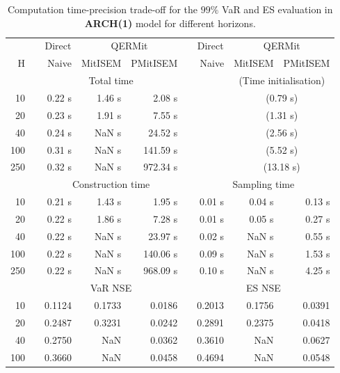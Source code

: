 \footnotesize{  
{ \renewcommand{\arraystretch}{1.3} 
\begin{longtable}{rr rrr r rrr}  
\caption{Computation time-precision trade-off for the  $99\%$ VaR and ES evaluation in \textbf{ARCH(1)} model for different horizons.} 
\label{tab:time_precision_arch_ML} \\ 
 & & \multicolumn{1}{c}{Direct} & \multicolumn{2}{c}{QERMit}&  & \multicolumn{1}{c}{Direct} & \multicolumn{2}{c}{QERMit} \\ \cline{3-5} \cline{7-9} 
 H & & Naive & MitISEM & PMitISEM & & Naive & MitISEM & PMitISEM \\ \hline 
 & & \multicolumn{3}{c}{Total time} & & & \multicolumn{2}{c}{(Time initialisation)}  \\ \cline{3-5} \cline{8-9}
10 & & 0.22 s & 1.46 s & 2.08 s &&& \multicolumn{2}{c}{(0.79 s)} \\ 
20 & & 0.23 s & 1.91 s & 7.55 s &&& \multicolumn{2}{c}{(1.31 s)} \\ 
40 & & 0.24 s &  NaN s & 24.52 s &&& \multicolumn{2}{c}{(2.56 s)} \\ 
100 & & 0.31 s &  NaN s & 141.59 s &&& \multicolumn{2}{c}{(5.52 s)} \\ 
250 & & 0.32 s &  NaN s & 972.34 s &&& \multicolumn{2}{c}{(13.18 s)} \\ 
\hline 
 & & \multicolumn{3}{c}{Construction time} & & \multicolumn{3}{c}{ Sampling time} \\ \cline{3-5}  \cline{7-9}
10 & & 0.21 s & 1.43 s & 1.95 s &&  0.01 s & 0.04 s & 0.13 s \\ 
20 & & 0.22 s & 1.86 s & 7.28 s &&  0.01 s & 0.05 s & 0.27 s \\ 
40 & & 0.22 s &  NaN s & 23.97 s &&  0.02 s &  NaN s & 0.55 s \\ 
100 & & 0.22 s &  NaN s & 140.06 s &&  0.09 s &  NaN s & 1.53 s \\ 
250 & & 0.22 s &  NaN s & 968.09 s &&  0.10 s &  NaN s & 4.25 s \\ 
\hline 
 & & \multicolumn{3}{c}{VaR NSE} &&  \multicolumn{3}{c}{ES NSE} \\ \cline{3-5}  \cline{7-9}
10 && 0.1124  & 0.1733  & 0.0186 && 0.2013  & 0.1756  & 0.0391  \\ 
20 && 0.2487  & 0.3231  & 0.0242 && 0.2891  & 0.2375  & 0.0418  \\ 
40 && 0.2750  &    NaN  & 0.0362 && 0.3610  &    NaN  & 0.0627  \\ 
100 && 0.3660  &    NaN  & 0.0458 && 0.4694  &    NaN  & 0.0548  \\ 

\end{longtable}}}
